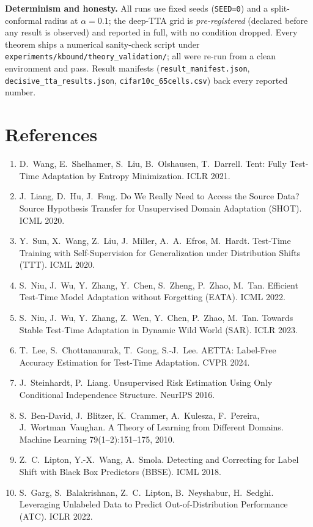 \documentclass[conference]{IEEEtran}
\theoremstyle{plain}
\theoremstyle{definition}
\begin{document}
\noindent\textbf{Determinism and honesty.} All runs use fixed seeds (\texttt{SEED=0}) and a
split-conformal radius at $\alpha=0.1$; the deep-TTA grid is \emph{pre-registered} (declared
before any result is observed) and reported in full, with no condition dropped. Every theorem
ships a numerical sanity-check script under \texttt{experiments/kbound/theory\_validation/}; all
were re-run from a clean environment and pass. Result manifests (\texttt{result\_manifest.json},
\texttt{decisive\_tta\_results.json}, \texttt{cifar10c\_65cells.csv}) back every reported number.

\section*{References}
\small
\begin{enumerate}\setlength{\itemsep}{1pt}
\item D.~Wang, E.~Shelhamer, S.~Liu, B.~Olshausen, T.~Darrell. Tent: Fully Test-Time Adaptation by Entropy Minimization. ICLR 2021.
\item J.~Liang, D.~Hu, J.~Feng. Do We Really Need to Access the Source Data? Source Hypothesis Transfer for Unsupervised Domain Adaptation (SHOT). ICML 2020.
\item Y.~Sun, X.~Wang, Z.~Liu, J.~Miller, A.~A.~Efros, M.~Hardt. Test-Time Training with Self-Supervision for Generalization under Distribution Shifts (TTT). ICML 2020.
\item S.~Niu, J.~Wu, Y.~Zhang, Y.~Chen, S.~Zheng, P.~Zhao, M.~Tan. Efficient Test-Time Model Adaptation without Forgetting (EATA). ICML 2022.
\item S.~Niu, J.~Wu, Y.~Zhang, Z.~Wen, Y.~Chen, P.~Zhao, M.~Tan. Towards Stable Test-Time Adaptation in Dynamic Wild World (SAR). ICLR 2023.
\item T.~Lee, S.~Chottananurak, T.~Gong, S.-J.~Lee. AETTA: Label-Free Accuracy Estimation for Test-Time Adaptation. CVPR 2024.
\item J.~Steinhardt, P.~Liang. Unsupervised Risk Estimation Using Only Conditional Independence Structure. NeurIPS 2016.
\item S.~Ben-David, J.~Blitzer, K.~Crammer, A.~Kulesza, F.~Pereira, J.~Wortman~Vaughan. A Theory of Learning from Different Domains. Machine Learning 79(1--2):151--175, 2010.
\item Z.~C.~Lipton, Y.-X.~Wang, A.~Smola. Detecting and Correcting for Label Shift with Black Box Predictors (BBSE). ICML 2018.
\item S.~Garg, S.~Balakrishnan, Z.~C.~Lipton, B.~Neyshabur, H.~Sedghi. Leveraging Unlabeled Data to Predict Out-of-Distribution Performance (ATC). ICLR 2022.

\end{enumerate}
\end{document}
